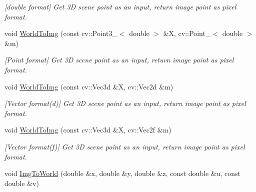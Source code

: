 \begin{DoxyCompactItemize}
\begin{DoxyCompactList}\small\item\em \mbox{[}double format\mbox{]} Get 3D scene point as an input, return image point as pixel format. \end{DoxyCompactList}\item 
void \hyperlink{classMultiColSLAM_1_1cCamModelGeneral___a6e3d31b5b392da4d04283e1812668a97}{World\+To\+Img} (const cv\+::\+Point3\+\_\+$<$ double $>$ \&X, cv\+::\+Point\+\_\+$<$ double $>$ \&m)\hypertarget{classMultiColSLAM_1_1cCamModelGeneral___a6e3d31b5b392da4d04283e1812668a97}{}\label{classMultiColSLAM_1_1cCamModelGeneral___a6e3d31b5b392da4d04283e1812668a97}

\begin{DoxyCompactList}\small\item\em \mbox{[}Point format\mbox{]} Get 3D scene point as an input, return image point as pixel format. \end{DoxyCompactList}\item 
void \hyperlink{classMultiColSLAM_1_1cCamModelGeneral___a4c682786d019d89156ef87574b4bfca0}{World\+To\+Img} (const cv\+::\+Vec3d \&X, cv\+::\+Vec2d \&m)\hypertarget{classMultiColSLAM_1_1cCamModelGeneral___a4c682786d019d89156ef87574b4bfca0}{}\label{classMultiColSLAM_1_1cCamModelGeneral___a4c682786d019d89156ef87574b4bfca0}

\begin{DoxyCompactList}\small\item\em \mbox{[}Vector format(d)\mbox{]} Get 3D scene point as an input, return image point as pixel format. \end{DoxyCompactList}\item 
void \hyperlink{classMultiColSLAM_1_1cCamModelGeneral___a3666d308b6a8eac58d4aed94b3b8f96a}{World\+To\+Img} (const cv\+::\+Vec3d \&X, cv\+::\+Vec2f \&m)\hypertarget{classMultiColSLAM_1_1cCamModelGeneral___a3666d308b6a8eac58d4aed94b3b8f96a}{}\label{classMultiColSLAM_1_1cCamModelGeneral___a3666d308b6a8eac58d4aed94b3b8f96a}

\begin{DoxyCompactList}\small\item\em \mbox{[}Vector format(f)\mbox{]} Get 3D scene point as an input, return image point as pixel format. \end{DoxyCompactList}\item 
void \hyperlink{classMultiColSLAM_1_1cCamModelGeneral___acd01f911ab2dbc9d6efe21e7029bb0f5}{Img\+To\+World} (double \&x, double \&y, double \&z, const double \&u, const double \&v)\hypertarget{classMultiColSLAM_1_1cCamModelGeneral___acd01f911ab2dbc9d6efe21e7029bb0f5}{}\label{classMultiColSLAM_1_1cCamModelGeneral___acd01f911ab2dbc9d6efe21e7029bb0f5}


\end{DoxyCompactItemize}
